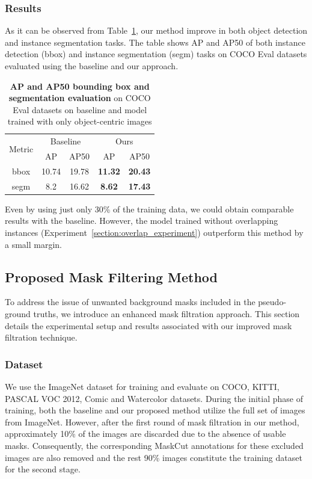 \subsubsection{Results}
As it can be observed from Table~\ref{tab:object-centric-analysis}, our method improve in both object detection and instance segmentation tasks. The table shows AP and AP50 of both instance detection (bbox) and instance segmentation (segm) tasks on COCO Eval datasets evaluated using the baseline and our approach.
\begin{table}[htbp]
	\centering
	\begin{tabular}{c|cc|cc}
		\toprule
		\multirow{2}{*}{Metric} & \multicolumn{2}{c|}{Baseline} & \multicolumn{2}{c}{Ours} \\ \cmidrule{2-5}
		& AP & AP50 & AP & AP50 \\ \midrule
		bbox & 10.74 & 19.78 & \textbf{11.32} & \textbf{20.43} \\
		\midrule
		segm & 8.2 & 16.62 & \textbf{8.62} & \textbf{17.43} \\
		\bottomrule
	\end{tabular}
	\caption[\textbf{Evaluation of baseline vs Model Trained with only object-centric images}]{\textbf{AP and AP50 bounding box and segmentation evaluation} on COCO Eval datasets on baseline and model trained with only object-centric images}
	\label{tab:object-centric-analysis}
\end{table}
Even by using just only 30\% of the training data, we could obtain comparable results with the baseline. However, the model trained without overlapping instances (Experiment~\ref{section:overlap_experiment}) outperform this method by a small margin.

\subsection{Proposed Mask Filtering Method}
\label{section:mask_refinement_experiment}
To address the issue of unwanted background masks included in the pseudo-ground truths, we introduce an enhanced mask filtration approach. This section details the experimental setup and results associated with our improved mask filtration technique.

\subsubsection{Dataset}
We use the ImageNet dataset for training and evaluate on COCO, KITTI, PASCAL VOC 2012, Comic and Watercolor datasets. During the initial phase of training, both the baseline and our proposed method utilize the full set of images from ImageNet. However, after the first round of mask filtration in our method, approximately 10\% of the images are discarded due to the absence of usable masks. Consequently, the corresponding MaskCut annotations for these excluded images are also removed and the rest 90\% images constitute the training dataset for the second stage.

